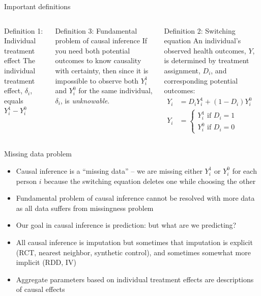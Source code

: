 \documentclass{beamer}
\begin{document}
\begin{frame}{Important definitions}


  \begin{columns}[t]
    \scriptsize

    \begin{block}{Definition 1: Individual treatment effect}
      The individual treatment effect,  $\delta_i$, equals $Y_i^1-Y_i^0$
    \end{block}
    \begin{block}{Definition 3: Fundamental problem of causal inference}
      If you need both potential outcomes to know causality with certainty, then since it is impossible to observe both $Y_i^1$ and $Y_i^0$ for the same individual, $\delta_i$, is \emph{unknowable}.
    \end{block}
    \begin{block}{Definition 2: Switching equation}
      An individual's observed health outcomes, $Y$, is determined by treatment assignment, $D_i$, and corresponding potential outcomes:
      \begin{eqnarray*}
        Y_i& = D_iY^1_i+(1-D_i)Y^0_i& \\
        Y_i& = \begin{cases}
          Y^1_i\text{ if }D_i=1 \\
          Y^0_i\text{ if }D_i=0
        \end{cases}
      \end{eqnarray*}
    \end{block}

  \end{columns}
\end{frame}

\begin{frame}{Missing data problem}

  \begin{itemize}
    \item Causal inference is a ``missing data'' -- we are missing either $Y^1_i$ or $Y^0_i$ for each person $i$ because the switching equation deletes one while choosing the other
    \item Fundamental problem of causal inference cannot be resolved with more data as all data suffers from missingness problem
    \item Our goal in causal inference is prediction: but what are we predicting?  
     \item All causal inference is imputation but sometimes that imputation is explicit (RCT, nearest neighbor, synthetic control), and sometimes somewhat more implicit (RDD, IV)
    \item Aggregate parameters based on individual treatment effects are descriptions of causal effects
  \end{itemize}

\end{frame}
\end{document}
